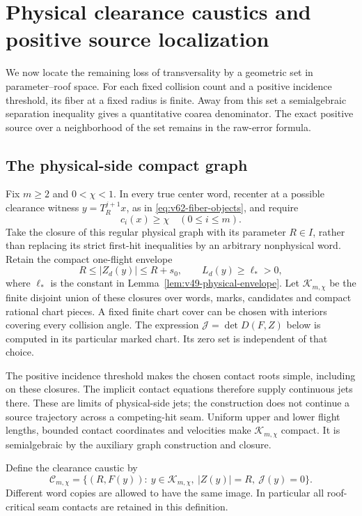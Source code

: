 \section{Physical clearance caustics and positive source localization}
\label{sec:v62-clearance-caustics}
We now locate the remaining loss of transversality by a geometric set
in parameter--roof space. For each fixed collision count and a positive
incidence threshold, its fiber at a fixed radius is finite. Away from
this set a semialgebraic separation inequality gives a quantitative
coarea denominator. The exact positive source over a neighborhood of
the set remains in the raw-error formula.

\subsection{The physical-side compact graph}
Fix $m\ge2$ and $0<\chi<1$. In every true center word, recenter at a
possible clearance witness $y=T_R^{j+1}x$, as in
\eqref{eq:v62-fiber-objects}, and require
\begin{equation}\label{eq:v62-incidence-cap}
 c_i(x)\ge\chi\quad(0\le i\le m).
\end{equation}
Take the closure of this regular physical graph with its parameter
$R\in I$, rather than replacing its strict first-hit inequalities by
an arbitrary nonphysical word. Retain the compact one-flight envelope
\[
 R\le |Z_d(y)|\le R+s_0,\qquad L_d(y)\ge\ell_*>0,
\]
where $\ell_*$ is the constant in
Lemma~\ref{lem:v49-physical-envelope}. Let $\mathcal K_{m,\chi}$ be
the finite disjoint union of these closures over words, marks,
candidates and compact rational chart pieces. A fixed finite chart
cover can be chosen with interiors covering every collision angle.
The expression $\mathcal J=\det D(F,Z)$ below is computed in its
particular marked chart. Its zero set is independent of that choice.

The positive incidence threshold makes the chosen contact roots simple,
including on these closures. The implicit contact equations therefore
supply continuous jets there. These are limits of physical-side jets;
the construction does not continue a source trajectory across a
competing-hit seam. Uniform upper and lower flight lengths, bounded
contact coordinates and velocities make $\mathcal K_{m,\chi}$ compact.
It is semialgebraic by the auxiliary graph construction and closure.

Define the clearance caustic by
\begin{equation}\label{eq:v62-caustic-set}
 \mathcal C_{m,\chi}
   =\{(R,F(y)):\ y\in\mathcal K_{m,\chi},\ |Z(y)|=R,
                                        \ \mathcal J(y)=0\}.
\end{equation}
Different word copies are allowed to have the same image. In particular
all roof-critical seam contacts are retained in this definition.

